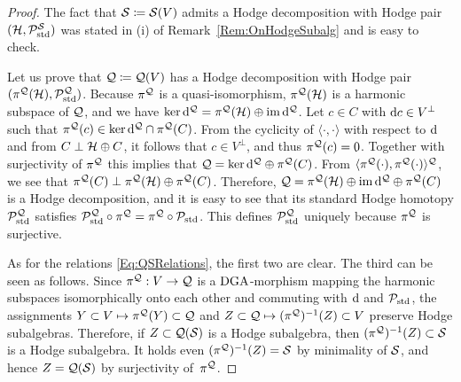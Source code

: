 \documentclass[\MainFolder/Text.tex]{subfiles}
\begin{document}
\begin{proof}
The fact that $\mathcal{S}\coloneqq\mathcal{S}(V)$ admits a Hodge decomposition with Hodge pair $(\mathcal{H},\mathcal{P}_{\mathrm{std}}^{\mathcal{S}})$ was stated in (i) of Remark~\ref{Rem:OnHodgeSubalg} and is easy to check.

Let us prove that $\mathcal{Q}\coloneqq \mathcal{Q}(V)$ has a Hodge decomposition with Hodge pair $(\pi^{\mathcal{Q}}(\mathcal{H}),\mathcal{P}_{\mathrm{std}}^{\mathcal{Q}})$. Because $\pi^{\mathcal{Q}}$ is a quasi-isomorphism, $\pi^{\mathcal{Q}}(\mathcal{H})$ is a harmonic subspace of $\mathcal{Q}$, and we have $\operatorname{ker} \mathrm{d}^{\mathcal{Q}} = \pi^{\mathcal{Q}}(\mathcal{H})\oplus \operatorname{im} \mathrm{d}^{\mathcal{Q}}$. Let $c\in C$ with $\mathrm{d} c \in V^\perp$ such that $\pi^{\mathcal{Q}}(c)\in\operatorname{ker}\mathrm{d}^{\mathcal{Q}} \cap \pi^{\mathcal{Q}}(C)$. From the cyclicity of $\langle\cdot,\cdot\rangle$ with respect to $\mathrm{d}$ and from $C\perp\mathcal{H}\oplus C$, it follows that $c\in V^\perp$, and thus $\pi^{\mathcal{Q}}(c)=0$. Together with surjectivity of $\pi^{\mathcal{Q}}$ this implies that $\mathcal{Q} = \ker \mathrm{d}^{\mathcal{Q}} \oplus \pi^{\mathcal{Q}}(C)$. From $\langle \pi^{\mathcal{Q}}(\cdot),\pi^{\mathcal{Q}}(\cdot)\rangle^{\mathcal{Q}}$, we see that $\pi^{\mathcal{Q}}(C) \perp \pi^{\mathcal{Q}}(\mathcal{H}) \oplus \pi^{\mathcal{Q}}(C)$. Therefore, $\mathcal{Q} = \pi^{\mathcal{Q}}(\mathcal{H})\oplus\operatorname{im}\mathrm{d}^{\mathcal{Q}}\oplus\pi^{\mathcal{Q}}(C)$ is a Hodge decomposition, and it is easy to see that its standard Hodge homotopy $\mathcal{P}_{\mathrm{std}}^{\mathcal{Q}}$ satisfies $\mathcal{P}_{\mathrm{std}}^{\mathcal{Q}} \circ \pi^{\mathcal{Q}}=\pi^{\mathcal{Q}}\circ \mathcal{P}_{\mathrm{std}}$. This defines $\mathcal{P}_{\mathrm{std}}^{\mathcal{Q}}$ uniquely because $\pi^{\mathcal{Q}}$ is surjective.

As for the relations \eqref{Eq:QSRelations}, the first two are clear. The third can be seen as follows. Since $\pi^{\mathcal{Q}}: V \rightarrow \mathcal{Q}$ is a $\mathrm{DGA}$-morphism mapping the harmonic subspaces isomorphically onto each other and commuting with $\mathrm{d}$ and $\mathcal{P}_{\mathrm{std}}$, the assignments $Y\subset V \mapsto \pi^{\mathcal{Q}}(Y)\subset \mathcal{Q}$ and $Z\subset \mathcal{Q} \mapsto (\pi^{\mathcal{Q}})^{-1}(Z)\subset V$ preserve Hodge subalgebras. Therefore, if $Z\subset \mathcal{Q}(\mathcal{S})$ is a Hodge subalgebra, then $(\pi^{\mathcal{Q}})^{-1}(Z)\subset\mathcal{S}$ is a Hodge subalgebra. It holds even $(\pi^{\mathcal{Q}})^{-1}(Z)=\mathcal{S}$ by minimality of $\mathcal{S}$, and hence $Z=\mathcal{Q}(\mathcal{S})$ by surjectivity of~$\pi^{\mathcal{Q}}$.  
\end{proof}

\end{document}
